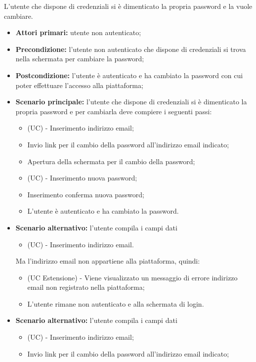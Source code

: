 L'utente che dispone di credenziali si è dimenticato la propria password e la vuole cambiare.
\begin{itemize}
    \item \textbf{Attori primari:} utente non autenticato;
    \item \textbf{Precondizione:} l'utente non autenticato che dispone di credenziali si trova nella schermata per cambiare la password;
    \item \textbf{Postcondizione:} l'utente è autenticato e ha cambiato la password con cui poter effettuare l'accesso alla piattaforma;
    \item \textbf{Scenario principale:} l'utente che dispone di credenziali si è dimenticato la propria password e per cambiarla deve compiere i seguenti passi:
    \begin{itemize}
        \item (UC) - Inserimento indirizzo email;
        \item Invio link per il cambio della password all'indirizzo email indicato;
        \item Apertura della schermata per il cambio della password;
        \item (UC) - Inserimento nuova password;
        \item Inserimento conferma nuova password;
        \item L'utente è autenticato e ha cambiato la password.
    \end{itemize}
	\item \textbf{Scenario alternativo:} l'utente compila i campi dati
	\begin{itemize}
		\item (UC) - Inserimento indirizzo email.
	\end{itemize}
	Ma l'indirizzo email non appartiene alla piattaforma, quindi:
	\begin{itemize}
		\item (UC Estensione) - Viene visualizzato un messaggio di errore indirizzo email non registrato nella piattaforma;
		\item L'utente rimane non autenticato e alla schermata di login.
	\end{itemize}
	\item \textbf{Scenario alternativo:} l'utente compila i campi dati
	\begin{itemize}
		\item (UC) - Inserimento indirizzo email;
		\item Invio link per il cambio della password all'indirizzo email indicato;

\end{itemize}
\end{itemize}
